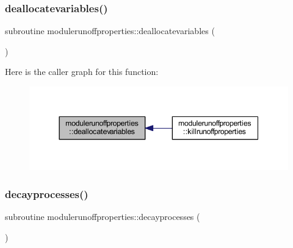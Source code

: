 \subsubsection{\texorpdfstring{deallocatevariables()}{deallocatevariables()}}
{\footnotesize\ttfamily subroutine modulerunoffproperties\+::deallocatevariables (\begin{DoxyParamCaption}{ }\end{DoxyParamCaption})\hspace{0.3cm}{\ttfamily [private]}}

Here is the caller graph for this function\+:\nopagebreak
\begin{figure}[H]
\begin{center}
\leavevmode
\includegraphics[width=344pt]{namespacemodulerunoffproperties_a5f6b0b75ea06dc86390d8f5059e913a5_icgraph}
\end{center}
\end{figure}
\mbox{\label{namespacemodulerunoffproperties_a22e352c7bc8cde1c67133693821b9c46}} 
\subsubsection{\texorpdfstring{decayprocesses()}{decayprocesses()}}
{\footnotesize\ttfamily subroutine modulerunoffproperties\+::decayprocesses (\begin{DoxyParamCaption}{ }\end{DoxyParamCaption})\hspace{0.3cm}{\ttfamily [private]}}

